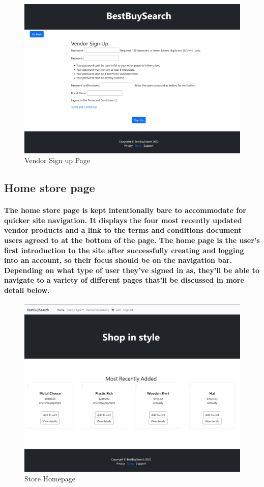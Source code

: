 \documentclass[sigconf]{acmart}
\begin{document}
\begin{figure}[H]
    \centering
    \includegraphics[scale=0.2]{VendorSignup.PNG}
    \caption{Vendor Sign up Page}
    \label{fig:my_label}
\end{figure}

\subsection{Home store page}

\paragraph{The home store page is kept intentionally bare to accommodate for quicker site navigation. It displays the four most recently updated vendor products and a link to the terms and conditions document users agreed to at the bottom of the page. The home page is the user's first introduction to the site after successfully creating and logging into an account, so their focus should be on the navigation bar. Depending on what type of user they've signed in as, they'll be able to navigate to a variety of different pages that'll be discussed in more detail below.}

\begin{figure}[H]
    \centering
    \includegraphics[scale=0.2]{ProductsHomepage.PNG}
    \caption{Store Homepage}
    \label{fig:my_label}
\end{figure}
\end{document}
